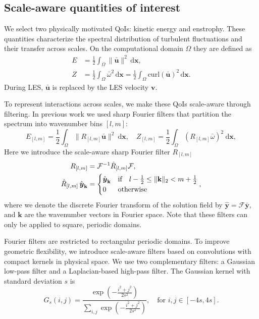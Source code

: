 \documentclass[]{elsarticle}
\newcommand{\D}{\mathrm{d}}
\begin{document}
\subsection{Scale-aware quantities of interest}
We select two physically motivated QoIs: kinetic energy and enstrophy. These quantities characterize the spectral distribution of turbulent fluctuations and their transfer across scales. On the computational domain $\Omega$ they are defined as
\begin{align}
    E &= \frac{1}{2} \int_\Omega \|\bar{\boldsymbol{u}}\|^2 \, \D \boldsymbol{x}, \\
    Z &= \frac{1}{2} \int_\Omega \bar{{\omega}}^2 \, \D\boldsymbol{x} = \frac{1}{2} \int_\Omega  \text{curl}( \bar{\boldsymbol{u}})^2 \, \D\boldsymbol{x}.
\end{align}
During LES, $\bar{\boldsymbol{u}}$ is replaced by the LES velocity $\boldsymbol{v}$.

To represent interactions across scales, we make these QoIs scale-aware through filtering. In previous work we used sharp Fourier filters that partition the spectrum into wavenumber bins $[l, m]$:
\begin{equation} \label{eq:scale-aware-energy-fourier}
    E_{[l, m]}
    =  \frac{1}{2} \int_\Omega \| R_{[l, m]} \bar{\boldsymbol{u}} \|^2 \ \D\boldsymbol{x}, \quad Z_{[l, m]}
    =  \frac{1}{2} \int_\Omega  \left(R_{[l, m]} \bar{{\omega}}\right)^2 \ \D\boldsymbol{x}, 
\end{equation}
Here we introduce the scale-aware sharp Fourier filter $R_{[l,m]}$
\begin{align}
    R_{[l,m]} &= \mathcal{F}^{-1} \hat{R}_{[l,m]} \mathcal{F}, \nonumber\\
    \hat{R}_{[l, m]} \,\hat{\boldsymbol{y}}_{\bf k} &=
    \begin{cases}
        \hat{\boldsymbol{y}}_{\mathbf{k}} & \text{if} \quad l-\frac{1}{2} \leq \lVert{\bf k}\rVert_2 < m + \frac{1}{2} \\
        0 & \text{otherwise}
    \end{cases},
\end{align}
where we denote the discrete Fourier transform of the solution field by $\hat{\boldsymbol{y}} = \mathcal{F}\bar{\boldsymbol{y}}$, and $\mathbf{k}$ are the wavenumber vectors in Fourier space. Note that these filters can only be applied to square, periodic domains.

Fourier filters are restricted to rectangular periodic domains. To improve geometric flexibility, we introduce scale-aware filters based on convolutions with compact kernels in physical space. We use two complementary filters: a Gaussian low-pass filter and a Laplacian-based high-pass filter. The Gaussian kernel with standard deviation $s$ is
\begin{equation}
    G_s(i,j) = \frac{\exp\left( -\frac{i^2+j^2}{2 s^2} \right)}{\sum_{i,j}\exp\left( -\frac{i^2+j^2}{2 s^2} \right)}, \quad \text{for } i,j \in [-4s, 4s].
\end{equation}
\end{document}
